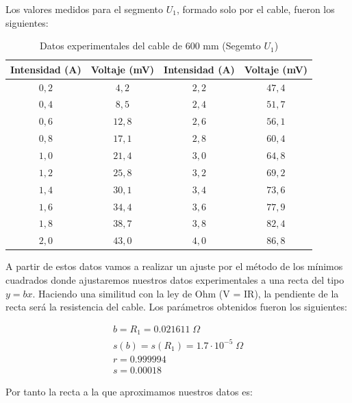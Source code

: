 \documentclass[a4paper,12pt,titlepage]{report}
\begin{document}
Los valores medidos para el segmento $U_{1}$, formado solo por el cable, fueron los siguientes:

\begin{table}[h!]
    \centering
    \begin{tabular}{|c|c|c|c|}
        \hline
        Intensidad (A) & Voltaje (mV) & Intensidad (A) & Voltaje (mV) \\
        \hline
        $0,2$ & $4,2$ & $2,2$ & $47,4$ \\
        \hline
        $0,4$ & $8,5$ & $2,4$ & $51,7$ \\
        \hline
        $0,6$ & $12,8$ & $2,6$ & $56,1$ \\
        \hline
        $0,8$ & $17,1$ & $2,8$ & $60,4$ \\
        \hline
        $1,0$ & $21,4$ & $3,0$ & $64,8$ \\
        \hline
        $1,2$ & $25,8$ & $3,2$ & $69,2$ \\
        \hline
        $1,4$ & $30,1$ & $3,4$ & $73,6$ \\
        \hline
        $1,6$ & $34,4$ & $3,6$ & $77,9$ \\
        \hline
        $1,8$ & $38,7$ & $3,8$ & $82,4$ \\
        \hline
        $2,0$ & $43,0$ & $4,0$ & $86,8$ \\
        \hline
    \end{tabular}
    \caption{Datos experimentales del cable de 600 mm (Segemto $U_{1}$)}
\end{table}

A partir de estos datos vamos a realizar un ajuste por el método de los mínimos cuadrados donde ajustaremos nuestros datos experimentales a una recta del tipo $y = bx$. Haciendo una similitud con la ley de Ohm (V = IR), la pendiente de la recta será la resistencia del cable. Los parámetros obtenidos fueron los siguientes:

\begin{equation}
    \begin{gathered}
        b = R_{1}=  0.021611 \; \Omega \\
        s(b)= s(R_{1}) = 1.7 \cdot 10^{-5} \; \Omega \\
        r =  0.999994 \\
        s =  0.00018
    \end{gathered}
\end{equation}

Por tanto la recta a la que aproximamos nuestros datos es:
\end{document}
